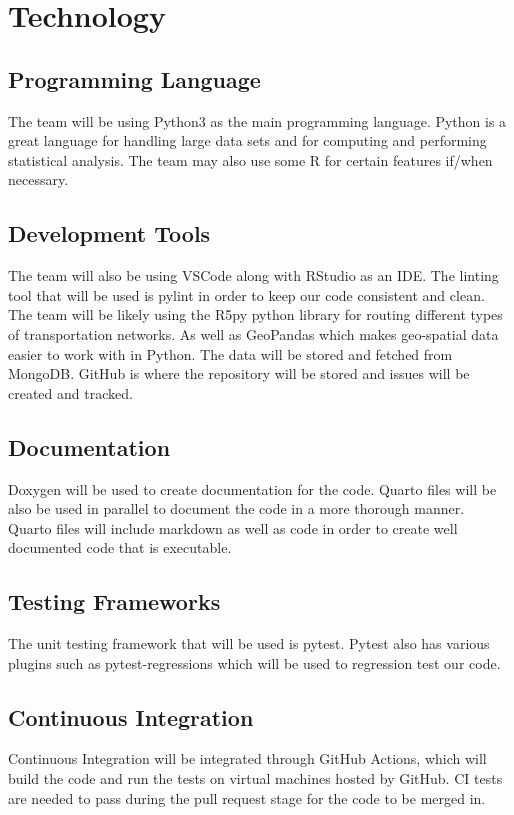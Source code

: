 \documentclass{article}
\begin{document}
\section{Technology}%

\subsection{Programming Language}
The team will be using Python3 as the main programming language. Python is a great language for handling large data sets and for computing and performing statistical analysis. The team may also use some R for certain features if/when necessary.

\subsection{Development Tools}
 The team will also be using VSCode along with RStudio as an IDE. The linting tool that will be used is pylint in order to keep our code consistent and clean. The team will be likely using the R5py python library for routing different types of transportation networks. As well as GeoPandas which makes geo-spatial data easier to work with in Python. The data will be stored and fetched from MongoDB. GitHub is where the repository will be stored and issues will be created and tracked.
 
\subsection{Documentation}
Doxygen will be used to create documentation for the code. Quarto files will be also be used in parallel to document the code in a more thorough manner. Quarto files will include markdown as well as code in order to create well documented code that is executable.

\subsection{Testing Frameworks}
The unit testing framework that will be used is pytest. Pytest also has various plugins such as pytest-regressions which will be used to regression test our code.
 
\subsection{Continuous Integration}
Continuous Integration will be integrated through GitHub Actions, which will build the code and run the tests on virtual machines hosted by GitHub. CI tests are needed to pass during the pull request stage for the code to be merged in.
\end{document}
